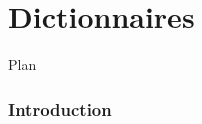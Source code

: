 
\part{Dictionnaires}






\begin{frame}{Plan}

\tableofcontents

\end{frame}


\section{Introduction}

